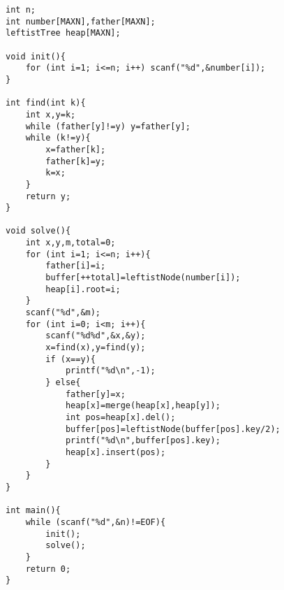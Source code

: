 \begin{verbatim}
int n;
int number[MAXN],father[MAXN];
leftistTree heap[MAXN];

void init(){
    for (int i=1; i<=n; i++) scanf("%d",&number[i]);
}

int find(int k){
    int x,y=k;
    while (father[y]!=y) y=father[y];
    while (k!=y){
        x=father[k];
        father[k]=y;
        k=x;
    }
    return y;
}

void solve(){
    int x,y,m,total=0;
    for (int i=1; i<=n; i++){
        father[i]=i;
        buffer[++total]=leftistNode(number[i]);
        heap[i].root=i;
    }
    scanf("%d",&m);
    for (int i=0; i<m; i++){
        scanf("%d%d",&x,&y);
        x=find(x),y=find(y);
        if (x==y){
            printf("%d\n",-1);
        } else{
            father[y]=x;
            heap[x]=merge(heap[x],heap[y]);
            int pos=heap[x].del();
            buffer[pos]=leftistNode(buffer[pos].key/2);
            printf("%d\n",buffer[pos].key);
            heap[x].insert(pos);
        }
    }
}

int main(){
    while (scanf("%d",&n)!=EOF){
        init();
        solve();
    }
    return 0;
}


\end{verbatim}


